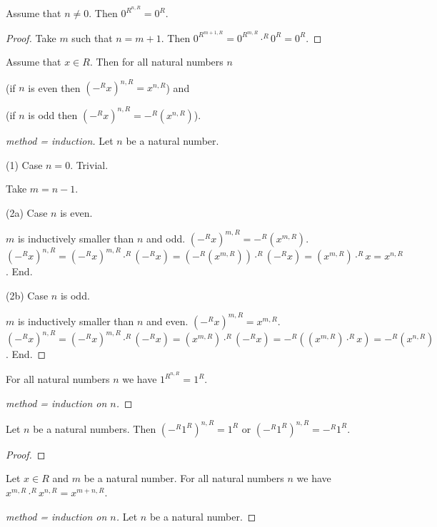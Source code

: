 \documentclass[11pt]{article}
\begin{document}
\begin{forthel}
\begin{lemma} Assume that $n \neq 0$. Then $0^{R}^{n,R} = 0^{R}$. \end{lemma}
\begin{proof}
Take $m$ such that
$n = m + 1$. Then $0^{R}^{m+1,R} = 0^{R}^{m,R} \cdot^{R} 0^{R}
= 0^{R}$.
\end{proof}

\begin{lemma}
Assume that $x \in R$. Then for all natural numbers $n$

(if $n$ is even then $(-^{R}x)^{n,R} = x^{n,R}$)
and 

(if $n$ is odd then $(-^{R}x)^{n,R} = -^{R}(x^{n,R})$).
\end{lemma}
\begin{proof}[method = induction]
Let $n$ be a natural number.

(1) Case $n = 0$. Trivial.

Take $m = n - 1$.

(2a) Case $n$ is even. 

$m$ is inductively smaller than $n$ and odd.
$(-^{R}x)^{m,R} = -^{R}(x^{m,R})$.
$(-^{R}x)^{n,R} = (-^{R}x)^{m,R} \cdot^{R} (-^{R}x) = (-^{R}(x^{m,R})) \cdot^{R} (-^{R}x)
= (x^{m,R}) \cdot^{R} x = x^{n,R}$.
End.

(2b) Case $n$ is odd. 

$m$ is inductively smaller than $n$ and even.
$(-^{R}x)^{m,R} = x^{m,R}$.
$(-^{R}x)^{n,R} = (-^{R}x)^{m,R} \cdot^{R} (-^{R}x) = (x^{m,R}) \cdot^{R} (-^{R}x)
= -^{R} ((x^{m,R}) \cdot^{R} x) = -^{R}(x^{n,R})$.
End.

\end{proof}

\begin{lemma} For all natural numbers $n$ we have $1^{R}^{n,R} = 1^{R}$. \end{lemma}
\begin{proof}[method = induction on $n$]
\end{proof}

\begin{lemma} Let $n$ be a natural numbers. Then $(-^{R} 1^{R})^{n,R} = 1^{R}$
or $(-^{R} 1^{R})^{n,R} = -^{R} 1^{R}$. 
\end{lemma}
\begin{proof}
\end{proof}

\begin{lemma} Let $x \in R$ and $m$ be a natural number.
For all natural numbers $n$
we have
$x^{m,R} \cdot^{R} x^{n,R} = x^{m + n,R}$.
\end{lemma}
\begin{proof}[method = induction on $n$]
Let $n$ be a natural number.


\end{proof}
\end{forthel}
\end{document}

